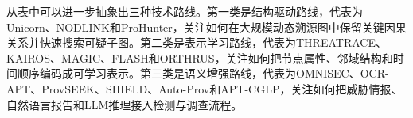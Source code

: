 从表中可以进一步抽象出三种技术路线。第一类是结构驱动路线，代表为Unicorn、NODLINK和ProHunter，关注如何在大规模动态溯源图中保留关键因果关系并快速搜索可疑子图\citep{prohunter2026}。第二类是表示学习路线，代表为THREATRACE、KAIROS、MAGIC、FLASH和ORTHRUS，关注如何把节点属性、邻域结构和时间顺序编码成可学习表示。第三类是语义增强路线，代表为OMNISEC、OCR-APT、ProvSEEK、SHIELD、Auto-Prov和APT-CGLP，关注如何把威胁情报、自然语言报告和LLM推理接入检测与调查流程\citep{provseek2025,shield2025,aptcglp2025,autoprov2026}。
